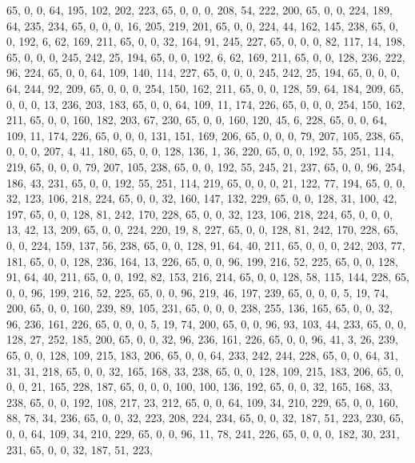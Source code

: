 \begin{DoxyCode}
       65, 0, 0, 64, 195, 102, 202, 223, 65, 0, 0, 0, 208, 54, 222, 200, 65, 0, 0, 224, 189, 64, 235, 234, 65, 0,
       0, 0, 16, 205, 219, 201, 65, 0, 0, 224, 44, 162, 145, 238, 65, 0, 0, 192, 6, 62, 169, 211, 65, 0, 0, 32,
       164, 91, 245, 227, 65, 0, 0, 0, 82, 117, 14, 198, 65, 0, 0, 0, 245, 242, 25, 194, 65, 0, 0, 192, 6, 62, 169,
       211, 65, 0, 0, 128, 236, 222, 96, 224, 65, 0, 0, 64, 109, 140, 114, 227, 65, 0, 0, 0, 245, 242, 25, 194, 65,
       0, 0, 0, 64, 244, 92, 209, 65, 0, 0, 0, 254, 150, 162, 211, 65, 0, 0, 128, 59, 64, 184, 209, 65, 0, 0, 0, 13,
       236, 203, 183, 65, 0, 0, 64, 109, 11, 174, 226, 65, 0, 0, 0, 254, 150, 162, 211, 65, 0, 0, 160, 182, 203,
       67, 230, 65, 0, 0, 160, 120, 45, 6, 228, 65, 0, 0, 64, 109, 11, 174, 226, 65, 0, 0, 0, 131, 151, 169, 206,
       65, 0, 0, 0, 79, 207, 105, 238, 65, 0, 0, 0, 207, 4, 41, 180, 65, 0, 0, 128, 136, 1, 36, 220, 65, 0, 0, 192,
       55, 251, 114, 219, 65, 0, 0, 0, 79, 207, 105, 238, 65, 0, 0, 192, 55, 245, 21, 237, 65, 0, 0, 96, 254, 186,
       43, 231, 65, 0, 0, 192, 55, 251, 114, 219, 65, 0, 0, 0, 21, 122, 77, 194, 65, 0, 0, 32, 123, 106, 218, 224,
       65, 0, 0, 32, 160, 147, 132, 229, 65, 0, 0, 128, 31, 100, 42, 197, 65, 0, 0, 128, 81, 242, 170, 228, 65, 0,
       0, 32, 123, 106, 218, 224, 65, 0, 0, 0, 13, 42, 13, 209, 65, 0, 0, 224, 220, 19, 8, 227, 65, 0, 0, 128, 81,
       242, 170, 228, 65, 0, 0, 224, 159, 137, 56, 238, 65, 0, 0, 128, 91, 64, 40, 211, 65, 0, 0, 0, 242, 203, 77,
       181, 65, 0, 0, 128, 236, 164, 13, 226, 65, 0, 0, 96, 199, 216, 52, 225, 65, 0, 0, 128, 91, 64, 40, 211, 65,
       0, 0, 192, 82, 153, 216, 214, 65, 0, 0, 128, 58, 115, 144, 228, 65, 0, 0, 96, 199, 216, 52, 225, 65, 0, 0,
       96, 219, 46, 197, 239, 65, 0, 0, 0, 5, 19, 74, 200, 65, 0, 0, 160, 239, 89, 105, 231, 65, 0, 0, 0, 238, 255,
       136, 165, 65, 0, 0, 32, 96, 236, 161, 226, 65, 0, 0, 0, 5, 19, 74, 200, 65, 0, 0, 96, 93, 103, 44, 233, 65,
       0, 0, 128, 27, 252, 185, 200, 65, 0, 0, 32, 96, 236, 161, 226, 65, 0, 0, 96, 41, 3, 26, 239, 65, 0, 0, 128,
       109, 215, 183, 206, 65, 0, 0, 64, 233, 242, 244, 228, 65, 0, 0, 64, 31, 31, 31, 218, 65, 0, 0, 32, 165, 168,
       33, 238, 65, 0, 0, 128, 109, 215, 183, 206, 65, 0, 0, 0, 21, 165, 228, 187, 65, 0, 0, 0, 100, 100, 136, 192,
       65, 0, 0, 32, 165, 168, 33, 238, 65, 0, 0, 192, 108, 217, 23, 212, 65, 0, 0, 64, 109, 34, 210, 229, 65, 0,
       0, 160, 88, 78, 34, 236, 65, 0, 0, 32, 223, 208, 224, 234, 65, 0, 0, 32, 187, 51, 223, 230, 65, 0, 0, 64,
       109, 34, 210, 229, 65, 0, 0, 96, 11, 78, 241, 226, 65, 0, 0, 0, 182, 30, 231, 231, 65, 0, 0, 32, 187, 51, 223,

\end{DoxyCode}
